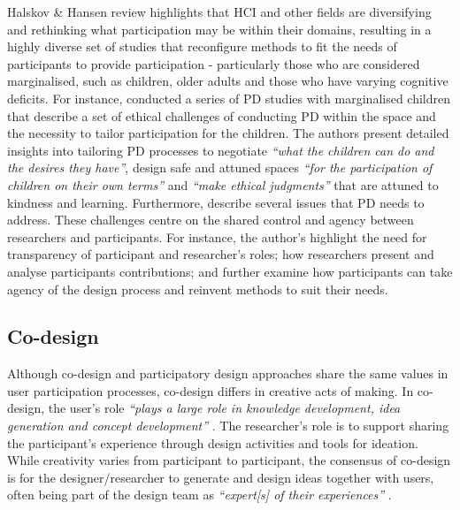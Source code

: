Halskov \& Hansen review highlights that HCI and other fields are diversifying and rethinking what participation may be within their domains, resulting in a highly diverse set of studies that reconfigure methods to fit the needs of participants to provide participation - particularly those who are considered marginalised, such as children, older adults and those who have varying cognitive deficits. For instance, \cite{spiel2018micro} conducted a series of PD studies with marginalised children that describe a set of ethical challenges of conducting PD within the space and the necessity to tailor participation for the children. The authors present detailed insights into tailoring PD processes to negotiate \textit{``what the children can do and the desires they have''}, design safe and attuned spaces \textit{``for the participation of children on their own terms''} and \textit{``make ethical judgments''} that are attuned to kindness and learning. Furthermore, \cite{vines_configuring_2013} describe several issues that PD needs to address. These challenges centre on the shared control and agency between researchers and participants. For instance, the author's highlight the need for transparency of participant and researcher's roles; how researchers present and analyse participants contributions; and further examine how participants can take agency of the design process and reinvent methods to suit their needs.

\subsection{Co-design}
\label{co-design}
Although co-design and participatory design approaches share the same values in user participation processes, co-design differs in creative acts of making. In co-design, the user's role \textit{``plays a large role in knowledge development, idea generation and concept development''} \citep{sanders2008co}. The researcher's role is to support sharing the participant's experience through design activities and tools for ideation. While creativity varies from participant to participant, the consensus of co-design is for the designer/researcher to generate and design ideas together with users, often being part of the design team as \textit{``expert[s] of their experiences''} \citep{visser2005contextmapping}.   

